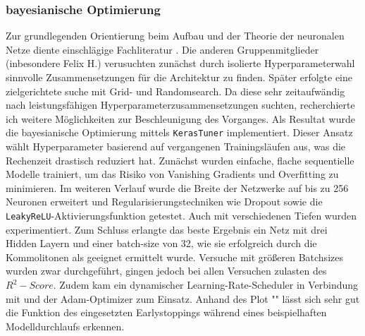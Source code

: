 \documentclass[9pt,a4paper,twocolumn,twoside]{tau-class/tau}
\begin{document}
\subsubsection{bayesianische Optimierung}
Zur grundlegenden Orientierung beim Aufbau und der Theorie der neuronalen Netze diente einschlägige Fachliteratur \cite{russell2020ai}.
Die anderen Gruppenmitglieder (inbesondere Felix H.) verusuchten zunächst durch isolierte Hyperparameterwahl sinnvolle Zusammensetzungen
für die Architektur zu finden. Später erfolgte eine zielgerichtete suche mit Grid- und Randomsearch.
Da diese sehr zeitaufwändig nach leistungsfähigen Hyperparameterzusammensetzungen suchten, recherchierte ich weitere Möglichkeiten zur Beschleunigung des Vorganges.
Als Resultat wurde die bayesianische Optimierung mittels \texttt{KerasTuner} \cite{kerastuner2019} implementiert.
Dieser Ansatz wählt Hyperparameter basierend auf vergangenen Trainingsläufen aus, was die Rechenzeit drastisch reduziert hat.
Zunächst wurden einfache, flache sequentielle Modelle \cite{keras_sequential} trainiert, um das Risiko von Vanishing Gradients und Overfitting zu minimieren.
Im weiteren Verlauf wurde die Breite der Netzwerke auf bis zu 256 Neuronen erweitert und Regularisierungstechniken wie Dropout sowie die \texttt{LeakyReLU}-Aktivierungsfunktion getestet.
Auch mit verschiedenen Tiefen wurden experimentiert. Zum Schluss erlangte das beste Ergebnis ein Netz mit drei Hidden Layern und einer batch-size von 32,
wie sie erfolgreich durch die Kommolitonen als geeignet ermittelt wurde.
Versuche mit größeren Batchsizes wurden zwar durchgeführt, gingen jedoch bei allen Versuchen zulasten des $R^2-Score$.
Zudem kam ein dynamischer Learning-Rate-Scheduler in Verbindung mit \cite{early_Stopping} und der Adam-Optimizer zum Einsatz. Anhand des Plot "" lässt sich sehr gut die Funktion des eingesetzten Earlystoppings während eines 
beispielhaften Modelldurchlaufs erkennen.
\end{document}

